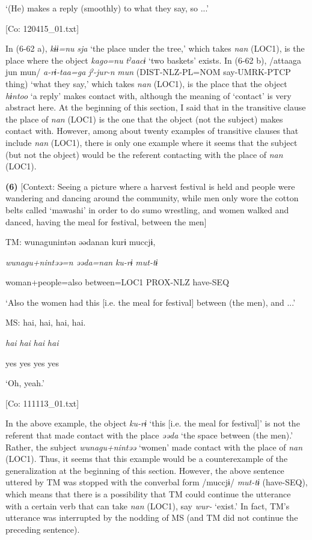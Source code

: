       ‘(He) makes a reply (smoothly) to what they say, so ...’

      [Co: 120415\_01.txt]

In (6-62 a), \textit{kɨɨ=nu} \textit{sja} ‘the place under the tree,’ which takes \textit{nan} (LOC1), is the place where the object \textit{kago=nu} \textit{tˀaacɨ} ‘two baskets’ exists. In (6-62 b), /attaaga jun mun/ \textit{a-rɨ-taa=ga} \textit{jˀ-jur-n} \textit{mun} (DIST-NLZ-PL=NOM say-UMRK-PTCP thing) ‘what they say,’ which takes \textit{nan} (LOC1), is the place that the object \textit{hɨntoo} ‘a reply’ makes contact with, although the meaning of ‘contact’ is very abstract here. At the beginning of this section, I said that in the transitive clause the place of \textit{nan} (LOC1) is the one that the object (not the subject) makes contact with. However, among about twenty examples of transitive clauses that include \textit{nan} (LOC1), there is only one example where it seems that the subject (but not the object) would be the referent contacting with the place of \textit{nan} (LOC1).

\textbf{(6)}  [Context: Seeing a picture where a harvest festival is held and people were wandering and dancing around the community, while men only wore the cotton belts called ‘mawashi’ in order to do sumo wrestling, and women walked and danced, having the meal for festival, between the men]

  TM:  wunagunintən  əədanan  kurɨ  muccjɨ,

    \textit{wunagu+nintəə=n}  \textit{əəda=nan}  \textit{ku-rɨ}  \textit{mut-tɨ}

    woman+people=also  between=LOC1  PROX-NLZ  have-SEQ

    ‘Also the women had this [i.e. the meal for festival] between (the men), and ...’

  MS:  {\textbar}hai,  hai,  hai,  hai.{\textbar}

    \textit{hai}  \textit{hai}  \textit{hai}  \textit{hai}

    yes  yes  yes  yes

    ‘Oh, yeah.’

    [Co: 111113\_01.txt]

In the above example, the object \textit{ku-rɨ} ‘this [i.e. the meal for festival]’ is not the referent that made contact with the place \textit{əəda} ‘the space between (the men).’ Rather, the subject \textit{wunagu+nintəə} ‘women’ made contact with the place of \textit{nan} (LOC1). Thus, it seems that this example would be a counterexample of the generalization at the beginning of this section. However, the above sentence uttered by TM was stopped with the converbal form /muccjɨ/ \textit{mut-tɨ} (have-SEQ), which means that there is a possibility that TM could continue the utterance with a certain verb that can take \textit{nan} (LOC1), say \textit{wur-} ‘exist.’ In fact, TM’s utterance was interrupted by the nodding of MS (and TM did not continue the preceding sentence).

